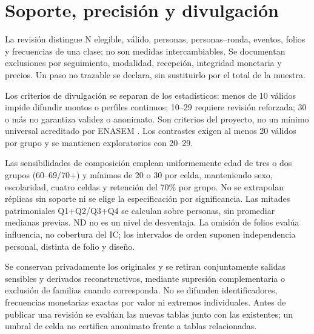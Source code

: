 
\section{Soporte, precisión y divulgación}
\label{sec:calidad10}

La revisión distingue N elegible, válido, personas, personas--ronda,
eventos, folios y frecuencias de una clase; no son medidas intercambiables.
Se documentan exclusiones por seguimiento, modalidad, recepción, integridad
monetaria y precios. Un paso no trazable se declara, sin sustituirlo por el
total de la muestra.

Los criterios de divulgación se separan de los estadísticos: menos de 10
válidos impide difundir montos o perfiles continuos; 10--29 requiere revisión
reforzada; 30 o más no garantiza validez o anonimato. Son criterios del
proyecto, no un mínimo universal acreditado por ENASEM
\citep{mhas2026condiciones,inegi2021confidencialidad}. Los contrastes exigen
al menos 20 válidos por grupo y se mantienen exploratorios con 20--29.

Las sensibilidades de composición emplean uniformemente edad de tres o dos
grupos (60--69/70+) y mínimos de 20 o 30 por celda, manteniendo sexo,
escolaridad, cuatro celdas y retención del 70\% por grupo. No se extrapolan
réplicas sin soporte ni se elige la especificación por significancia.
Las mitades patrimoniales Q1+Q2/Q3+Q4 se calculan sobre personas, sin
promediar medianas previas. ND no es un nivel de desventaja. La omisión de
folios evalúa influencia, no cobertura del IC; los intervalos de orden
suponen independencia personal, distinta de folio y diseño.

Se conservan privadamente los originales y se retiran conjuntamente salidas
sensibles y derivados reconstructivos, mediante supresión complementaria o
exclusión de familias cuando corresponda. No se difunden identificadores,
frecuencias monetarias exactas por valor ni extremos individuales. Antes de
publicar una revisión se evalúan las nuevas tablas junto con las existentes;
un umbral de celda no certifica anonimato frente a tablas relacionadas.
